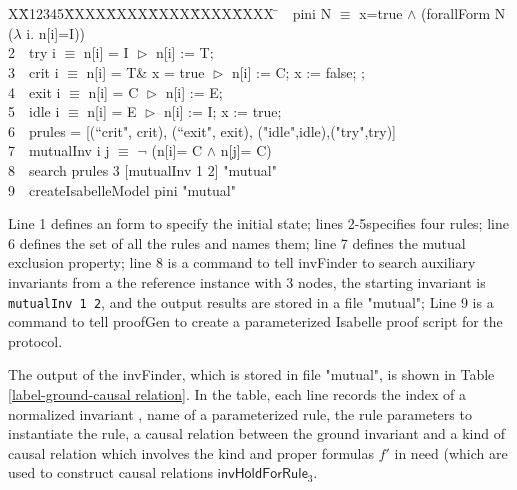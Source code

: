 \documentclass{llncs}
\newlength{\fminilength}
\newenvironment{fmini}[1][\linewidth]
  {\setlength{\fminilength}{#1\fboxsep-2\fboxrule}%
   \vspace{2ex}\noindent\begin{lrbox}{\fminibox}\begin{minipage}{\fminilength}%
   \mbox{ }\hfill\vspace{-2.5ex}}%
  {\end{minipage}\end{lrbox}\vspace{1ex}\hspace{0ex}%
   \framebox{\usebox{\fminibox}}}
\newenvironment{specification}
{\noindent\scriptsize
\tt\begin{fmini}\begin{tabbing}X\=X12345\=XXXX\=XXXX\=XXXX\=XXXX\=XXXX
\=\+\kill} {\end{tabbing}\normalfont\end{fmini}}
\def \twoSpaces {\ \ }
\begin{document}
\begin{specification}
1\twoSpaces   pini  N $\equiv$
   x=true $\wedge$ (forallForm N ($\lambda$ i. n[i]=I))\\

2\twoSpaces    try i $\equiv$ n[i] = I $\vartriangleright$ n[i] := T; \\

3\twoSpaces    crit i $\equiv$ n[i] = T\& x = true $\vartriangleright$  n[i] := C; x := false;  ;\\

4\twoSpaces   exit i $\equiv$ n[i] = C $\vartriangleright$ n[i] := E; \\


5\twoSpaces   idle  i $\equiv$  n[i] = E $\vartriangleright$ n[i] := I;  x := true;\\%

6\twoSpaces   prules  = [(``crit", crit), (``exit", exit), ("idle",idle),("try",try)]\\

7\twoSpaces mutualInv i j $\equiv$
  $\neg$ (n[i]= C $\wedge$ n[j]= C)\\

8\twoSpaces  search prules 3 [mutualInv 1 2] "mutual" \\

9\twoSpaces  createIsabelleModel pini "mutual" \\

\end{specification}

Line 1 defines an form to specify the initial state; lines 2-5specifies four rules; line 6 defines the set of all the rules and names them;
 line 7 defines the mutual exclusion property; line 8 is a command to tell {\sf invFinder} to search auxiliary invariants from a the reference instance with 3 nodes,   the starting invariant is {\tt mutualInv 1 2}, and the output results are stored in a file "mutual"; Line 9 is a command to tell {\sf proofGen}
  to create a parameterized Isabelle proof script for the protocol.

 The output of the {\sf invFinder}, which is stored in file "mutual",  is shown in Table
\ref{label-ground-causal relation}. In the table,  each line records the    index of a normalized   invariant , name of a parameterized rule, the rule
  parameters to instantiate the rule, a causal relation between
  the ground invariant and a kind of causal relation which involves the kind and proper formulas
  $f'$   in need (which are used to construct
      causal relations $\mathsf{invHoldForRule}_3$.
\end{document}
